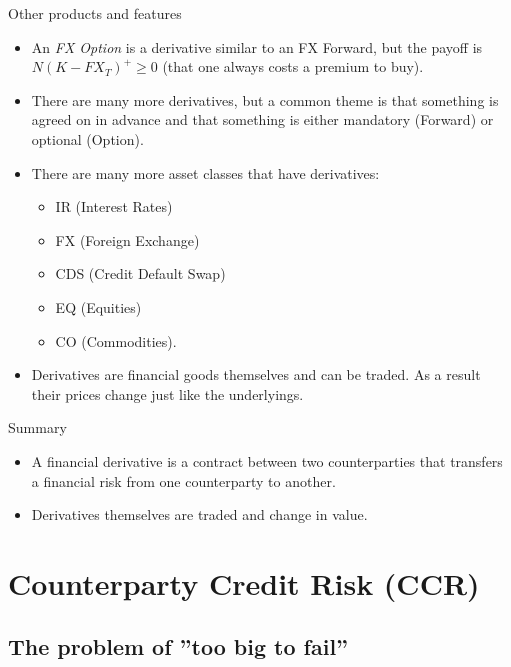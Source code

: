 \documentclass[t]{beamer}
\begin{document}
\begin{frame}{Other products and features}
	\begin{itemize}
		\item
			An \emph{FX Option} is a derivative similar to an FX Forward, but the payoff is $N(K-FX_{T})^{+} \geq 0$ (that one always costs a premium to buy).
		\item
			There are many more derivatives, but a common theme is that something is agreed on in advance and that something is either mandatory (Forward) or optional (Option).
		\item
			There are many more asset classes that have derivatives: 
			\begin{itemize}
				\item
					IR (Interest Rates)
				\item
					FX (Foreign Exchange)
				\item
					CDS (Credit Default Swap)
				\item
					EQ (Equities)
				\item
					CO (Commodities).
			\end{itemize}
		\item
		Derivatives are financial goods themselves and can be traded. As a result their prices change just like the underlyings.			
	\end{itemize}
\end{frame}

\begin{frame}{Summary}
	\begin{itemize}
		\item
			A financial derivative is a contract between two counterparties that transfers a financial risk from one counterparty to another.
		\item
			Derivatives themselves are traded and change in value.
	\end{itemize}
\end{frame}

\section{Counterparty Credit Risk (CCR)}

\subsection{The problem of ''too big to fail''}
\end{document}
